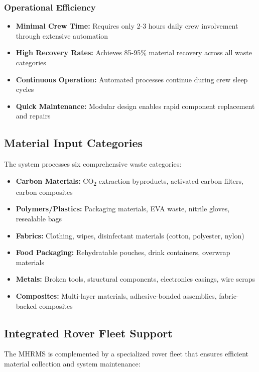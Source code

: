 \documentclass[12pt, a4paper]{article}
\begin{document}
\subsubsection{Operational Efficiency}
\begin{itemize}
    \item \textbf{Minimal Crew Time:} Requires only 2-3 hours daily crew involvement through extensive automation
    \item \textbf{High Recovery Rates:} Achieves 85-95\% material recovery across all waste categories
    \item \textbf{Continuous Operation:} Automated processes continue during crew sleep cycles
    \item \textbf{Quick Maintenance:} Modular design enables rapid component replacement and repairs
\end{itemize}

\subsection{Material Input Categories}

The system processes six comprehensive waste categories:

\begin{itemize}
    \item \textbf{Carbon Materials:} CO\textsubscript{2} extraction byproducts, activated carbon filters, carbon composites
    \item \textbf{Polymers/Plastics:} Packaging materials, EVA waste, nitrile gloves, resealable bags
    \item \textbf{Fabrics:} Clothing, wipes, disinfectant materials (cotton, polyester, nylon)
    \item \textbf{Food Packaging:} Rehydratable pouches, drink containers, overwrap materials
    \item \textbf{Metals:} Broken tools, structural components, electronics casings, wire scraps
    \item \textbf{Composites:} Multi-layer materials, adhesive-bonded assemblies, fabric-backed composites
\end{itemize}

\subsection{Integrated Rover Fleet Support}

The MHRMS is complemented by a specialized rover fleet that ensures efficient material collection and system maintenance:
\end{document}
